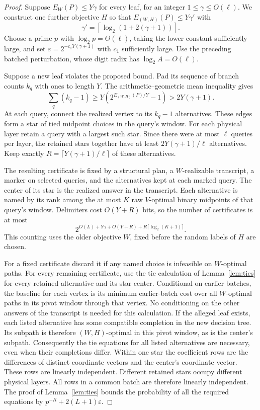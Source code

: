 \documentclass[11pt]{article}
\begin{document}
\begin{proof}
Suppose $E_W(P)\le Y\gamma$ for every leaf, for an integer
$1\le\gamma\le O(\ell)$. We construct one further objective $H$ so
that $E_{(W,H)}(P)\le Y\gamma'$ with
\[
           \gamma'=\left\lceil\log_2(1+2(\gamma+1))\right\rceil.
\]
Choose a prime $p$ with $\log_2 p=\Theta(\ell)$, taking the lower
constant sufficiently large, and set
$\varepsilon=2^{-c_1Y(\gamma+1)}$ with $c_1$ sufficiently large.
Use the preceding batched perturbation, whose digit radix has
$\log_2 A=O(\ell)$.

Suppose a new leaf violates the proposed bound. Pad its sequence of
branch counts $k_q$ with ones to length $Y$. The arithmetic--geometric
mean inequality gives
\[
    \sum_q(k_q-1)\ge Y(2^{E_{(W,H)}(P)/Y}-1)>2Y(\gamma+1).
\]
At each query, connect the realized vertex to its $k_q-1$ alternatives.
These edges form a star of tied midpoint choices in the query's window. For each
physical layer retain a query with a largest such star. Since there
were at most $\ell$ queries per layer, the retained stars together have
at least $2Y(\gamma+1)/\ell$ alternatives. Keep exactly
$R=\lceil Y(\gamma+1)/\ell\rceil$ of these alternatives.

The resulting certificate is fixed by a structural plan, a $W$-realizable
transcript, a marker on selected queries, and the alternatives kept at
each marked query. The center of its star is the realized answer in
the transcript. Each alternative is named by its rank among the
at most $K$ raw $V$-optimal binary midpoints of that query's window.
Delimiters cost $O(Y+R)$ bits, so the number of certificates is at most
\[
  2^{O(L)+Y\gamma+O(Y+R)+R\lceil\log_2(K+1)\rceil}.
\]
This counting uses the older objective $W$, fixed before the random
labels of $H$ are chosen.

For a fixed certificate discard it if any named choice is infeasible on
$W$-optimal paths. For every remaining certificate, use the tie calculation of Lemma~\ref{lem:ties}
for every retained alternative and its star center. Conditional on earlier
batches, the baseline for each vertex is its minimum earlier-batch cost
over all $W$-optimal paths in its pivot window through that vertex.
No conditioning on the other answers of the transcript is needed for
this calculation. If the alleged leaf exists, each listed alternative
has some compatible completion in the new decision tree. Its subpath is
therefore $(W,H)$-optimal in this pivot window, as is the center's subpath.
Consequently the tie equations for all listed alternatives are necessary,
even when their completions differ. Within one star the coefficient rows
are the differences of distinct coordinate vectors and the center's
coordinate vector. These rows are linearly independent. Different retained
stars occupy different physical layers. All rows in a common batch are
therefore linearly independent. The proof of Lemma~\ref{lem:ties} bounds
the probability of all the required equations by
$p^{-R}+2(L+1)\varepsilon$.


\end{proof}
\end{document}
